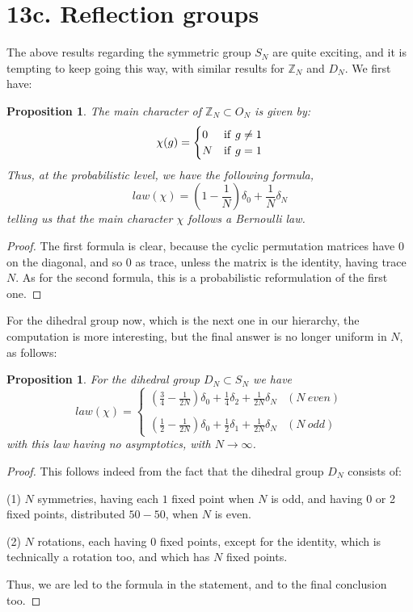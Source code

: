 \documentclass[12pt]{amsbook}
\newtheorem{proposition}[theorem]{Proposition}
\begin{document}
\section*{13c. Reflection groups}

The above results regarding the symmetric group $S_N$ are quite exciting, and it is tempting to keep going this way, with similar results for $\mathbb Z_N$ and $D_N$. We first have:

\begin{proposition}
The main character of $\mathbb Z_N\subset O_N$ is given by:
$$\chi(g)=\begin{cases}
0&{\rm if}\ g\neq1\\
N&{\rm if}\ g=1
\end{cases}$$
Thus, at the probabilistic level, we have the following formula,
$$law(\chi)=\left(1-\frac{1}{N}\right)\delta_0+\frac{1}{N}\delta_N$$
telling us that the main character $\chi$ follows a Bernoulli law.
\end{proposition}

\begin{proof}
The first formula is clear, because the cyclic permutation matrices have 0 on the diagonal, and so 0 as trace, unless the matrix is the identity, having trace $N$. As for the second formula, this is a probabilistic reformulation of the first one.
\end{proof}

For the dihedral group now, which is the next one in our hierarchy, the computation is more interesting, but the final answer is no longer uniform in $N$, as follows:


\begin{proposition}
For the dihedral group $D_N\subset S_N$ we have
$$law(\chi)=\begin{cases}
\left(\frac{3}{4}-\frac{1}{2N}\right)\delta_0+\frac{1}{4}\delta_2+\frac{1}{2N}\delta_N&(N\ even)\\
&\\
\left(\frac{1}{2}-\frac{1}{2N}\right)\delta_0+\frac{1}{2}\delta_1+\frac{1}{2N}\delta_N&(N\ odd)
\end{cases}$$
with this law having no asymptotics, with $N\to\infty$.
\end{proposition}

\begin{proof}
This follows indeed from the fact that the dihedral group $D_N$ consists of:

\medskip

(1) $N$ symmetries, having each $1$ fixed point when $N$ is odd, and having 0 or 2 fixed points, distributed $50-50$, when $N$ is even.

\medskip

(2) $N$ rotations, each having $0$ fixed points, except for the identity, which is technically a rotation too, and which has $N$ fixed points.

\medskip

Thus, we are led to the formula in the statement, and to the final conclusion too.
\end{proof}
\end{document}
